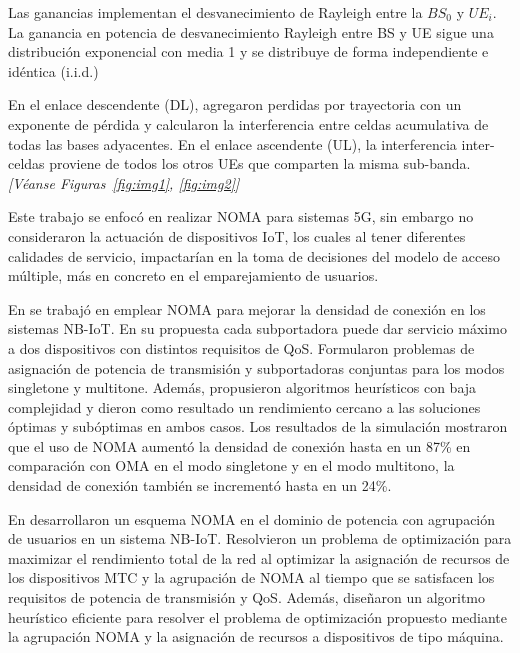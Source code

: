 Las ganancias implementan el desvanecimiento de Rayleigh entre la $BS_0$ y $UE_i$. La ganancia en potencia de desvanecimiento Rayleigh entre BS y UE sigue una distribución exponencial con media 1 y se distribuye de forma independiente e idéntica (i.i.d.)\newline

En el enlace descendente (DL), agregaron perdidas por trayectoria con un exponente de pérdida y calcularon la interferencia entre celdas acumulativa de todas las bases adyacentes. En el enlace ascendente (UL), la interferencia inter-celdas proviene de todos los otros UEs que comparten la misma sub-banda. \textit{[Véanse Figuras~\ref{fig:img1}, \ref{fig:img2}]}\newline

Este trabajo se enfocó en realizar NOMA para sistemas 5G, sin embargo no consideraron la actuación de dispositivos IoT, los cuales al tener diferentes calidades de servicio, impactarían en la toma de decisiones del modelo de acceso múltiple, más en concreto en el emparejamiento de usuarios.\newline

En \parencite{Mostafa2019} se trabajó en emplear NOMA para mejorar la densidad de conexión en los sistemas NB-IoT. En su propuesta cada subportadora puede dar servicio máximo a dos dispositivos con distintos requisitos de QoS. Formularon problemas de asignación de potencia de transmisión y subportadoras conjuntas para los modos singletone y multitone.  Además, propusieron algoritmos heurísticos con baja complejidad y dieron como resultado un rendimiento cercano a las soluciones óptimas y subóptimas en ambos casos. Los resultados de la simulación mostraron que el uso de NOMA aumentó la densidad de conexión hasta en un 87\% en comparación con OMA en el modo singletone y en el modo multitono, la densidad de conexión también se incrementó hasta en un 24\%.\newline

En \parencite{Shahini2019} desarrollaron un esquema NOMA en el dominio de potencia con agrupación de usuarios en un sistema NB-IoT. Resolvieron un problema de optimización para maximizar el rendimiento total de la red al optimizar la asignación de recursos de los dispositivos MTC y la agrupación de NOMA al tiempo que se satisfacen los requisitos de potencia de transmisión y QoS. Además, diseñaron un algoritmo heurístico eficiente para resolver el problema de optimización propuesto mediante la agrupación NOMA y la asignación de recursos a dispositivos de tipo máquina.\newline

